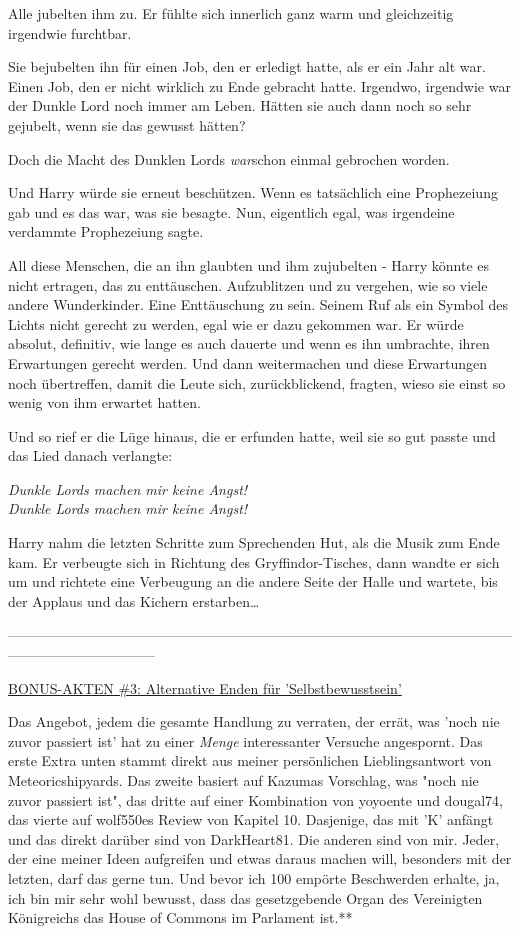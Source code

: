 {Alle jubelten ihm zu. Er fühlte sich innerlich ganz warm und gleichzeitig irgendwie furchtbar.

Sie bejubelten ihn für einen Job, den er erledigt hatte, als er ein Jahr alt war. Einen Job, den er nicht wirklich zu Ende gebracht hatte. Irgendwo, irgendwie war der Dunkle Lord noch immer am Leben. Hätten sie auch dann noch so sehr gejubelt, wenn sie das gewusst hätten?

Doch die Macht des Dunklen Lords \emph{war}schon einmal gebrochen worden.

Und Harry würde sie erneut beschützen. Wenn es tatsächlich eine Prophezeiung gab und es das war, was sie besagte. Nun, eigentlich egal, was irgendeine verdammte Prophezeiung sagte.

All diese Menschen, die an ihn glaubten und ihm zujubelten - Harry könnte es nicht ertragen, das zu enttäuschen. Aufzublitzen und zu vergehen, wie so viele andere Wunderkinder. Eine Enttäuschung zu sein. Seinem Ruf als ein Symbol des Lichts nicht gerecht zu werden, egal wie er dazu gekommen war. Er würde absolut, definitiv, wie lange es auch dauerte und wenn es ihn umbrachte, ihren Erwartungen gerecht werden. Und dann weitermachen und diese Erwartungen noch übertreffen, damit die Leute sich, zurückblickend, fragten, wieso sie einst so wenig von ihm erwartet hatten.

Und so rief er die Lüge hinaus, die er erfunden hatte, weil sie so gut passte und das Lied danach verlangte:

\emph{Dunkle Lords machen mir keine Angst!\\ Dunkle Lords machen mir keine Angst!}

Harry nahm die letzten Schritte zum Sprechenden Hut, als die Musik zum Ende kam. Er verbeugte sich in Richtung des Gryffindor-Tisches, dann wandte er sich um und richtete eine Verbeugung an die andere Seite der Halle und wartete, bis der Applaus und das Kichern erstarben…

--------------------------------------------------------------------------------------------------------------------------------------------

\uline{BONUS-AKTEN \#3: Alternative Enden für 'Selbstbewusstsein'}

Das Angebot, jedem die gesamte Handlung zu verraten, der errät, was 'noch nie zuvor passiert ist' hat zu einer \emph{Menge} interessanter Versuche angespornt. Das erste Extra unten stammt direkt aus meiner persönlichen Lieblingsantwort von Meteoricshipyards. Das zweite basiert auf Kazumas Vorschlag, was "noch nie zuvor passiert ist", das dritte auf einer Kombination von yoyoente und dougal74, das vierte auf wolf550es Review von Kapitel 10. Dasjenige, das mit 'K' anfängt und das direkt darüber sind von DarkHeart81. Die anderen sind von mir. Jeder, der eine meiner Ideen aufgreifen und etwas daraus machen will, besonders mit der letzten, darf das gerne tun. Und bevor ich 100 empörte Beschwerden erhalte, ja, ich bin mir sehr wohl bewusst, dass das gesetzgebende Organ des Vereinigten Königreichs das House of Commons im Parlament ist.**

}
